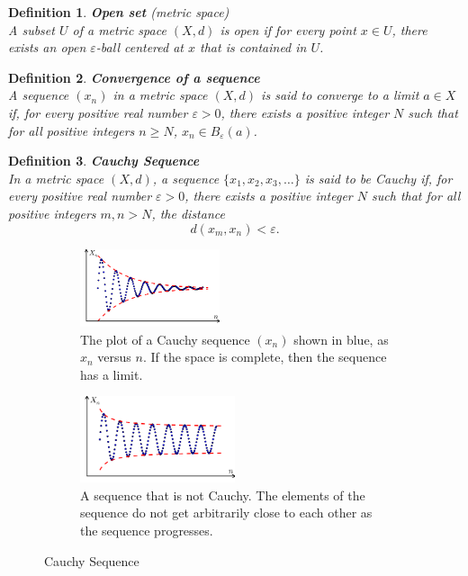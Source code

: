 \documentclass[11pt]{book} %
\newtheorem{definition}{Definition}[section]
\begin{document}
\begin{definition}{ \textbf{Open set} (metric space) } \\
    A subset \( U \) of a metric space \( (X, d) \) is open if for every point \( x \in U \), 
    there exists an open \(\varepsilon\)-ball centered at \( x \) that is contained in \( U \).
\end{definition}

\begin{definition}{\textbf{Convergence of a sequence}} \\
    A sequence \( (x_n) \) in a metric space \( (X, d) \) is said to \emph{converge} to a limit \( a \in X \) if, for every positive real number \( \varepsilon > 0 \),
    there exists a positive integer \( N \) such that for all positive integers \( n \geq N \), \( x_n \in B_{\varepsilon}(a) \).
\end{definition}

\begin{definition}{\textbf{Cauchy Sequence}} \\
    In a metric space \( (X, d) \), a sequence \( \{x_1, x_2, x_3, \ldots\} \) is said to be \emph{Cauchy} if, for every positive real number \( \varepsilon > 0 \),
     there exists a positive integer \( N \) such that for all positive integers \( m, n > N \), the distance
    \[ d(x_m, x_n) < \varepsilon. \]
\end{definition}

\begin{figure}[H]
    \begin{subfigure}{0.5\textwidth}
        \centering
        \includegraphics[width=0.45\textwidth]{Figs/Cauchy_sequence_illustration.png}
        \caption{The plot of a Cauchy sequence \( (x_n) \) shown in blue, as \( x_n \) versus \( n \). If the space is complete, then the sequence has a limit.}
    \end{subfigure}
    \hfill
    \begin{subfigure}{0.45\textwidth}
        \centering
        \includegraphics[width=0.5\textwidth]{Figs/Cauchy_sequence_illustration2.png}
        \caption{A sequence that is not Cauchy. The elements of the sequence do not get arbitrarily close to each other as the sequence progresses.}
    \end{subfigure}
    \caption{Cauchy Sequence}
\end{figure}
\end{document}
